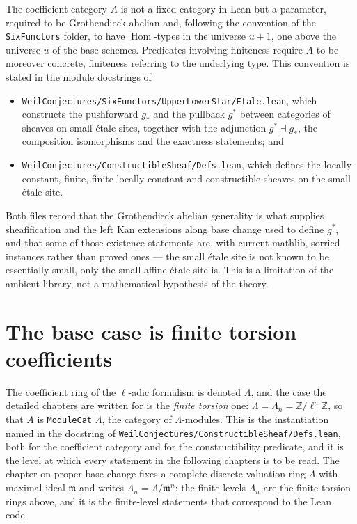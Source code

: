 The coefficient category $A$ is not a fixed category in Lean but a parameter,
required to be Grothendieck abelian and, following the convention of the
\texttt{SixFunctors} folder, to have $\operatorname{Hom}$-types in the universe
$u+1$, one above the universe $u$ of the base schemes.  Predicates involving
finiteness require $A$ to be moreover concrete, finiteness referring to the
underlying type.  This convention is stated in the module docstrings of
\begin{itemize}
  \item \texttt{WeilConjectures/SixFunctors/UpperLowerStar/Etale.lean}, which
        constructs the pushforward $g_*$ and the pullback $g^*$ between
        categories of sheaves on small \'etale sites, together with the
        adjunction $g^*\dashv g_*$, the composition isomorphisms and the
        exactness statements; and
  \item \texttt{WeilConjectures/ConstructibleSheaf/Defs.lean}, which defines
        the locally constant, finite, finite locally constant and
        constructible sheaves on the small \'etale site.
\end{itemize}
Both files record that the Grothendieck abelian generality is what supplies
sheafification and the left Kan extensions along base change used to define
$g^*$, and that some of those existence statements are, with current mathlib,
sorried instances rather than proved ones --- the small \'etale site is not
known to be essentially small, only the small affine \'etale site is.  This is
a limitation of the ambient library, not a mathematical hypothesis of the
theory.

\section{The base case is finite torsion coefficients}

The coefficient ring of the $\ell$-adic formalism is denoted $\Lambda$, and the
case the detailed chapters are written for is the \emph{finite torsion} one:
$\Lambda=\Lambda_n=\mathbb Z/\ell^n\mathbb Z$, so that $A$ is \texttt{ModuleCat}
$\Lambda$, the category of $\Lambda$-modules.  This is the instantiation named in the
docstring of \texttt{WeilConjectures/ConstructibleSheaf/Defs.lean}, both for
the coefficient category and for the constructibility predicate, and it is the
level at which every statement in the following chapters is to be read.  The
chapter on proper base change fixes a complete discrete valuation ring
$\Lambda$ with maximal ideal $\mathfrak m$ and writes
$\Lambda_n=\Lambda/\mathfrak m^n$; the finite levels $\Lambda_n$ are the finite
torsion rings above, and it is the finite-level statements that correspond to
the Lean code.

